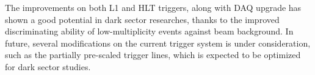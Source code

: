 The improvements on both L1 and HLT triggers, along with DAQ upgrade has shown a good potential in dark sector researches\cite{de2018first}\cite{macqueen2020dark}, thanks to the improved discriminating ability of low-multiplicity events against beam background. In future, several modifications on the current trigger system is under consideration, such as the partially pre-scaled trigger lines, which is expected to be optimized for dark sector studies\cite{b2book}. 


\begin{comment}
Based on the reasons discussed above, Belle II trigger has been designed to have 2 separated levels of triggers. Low level trigger, also called as L1 trigger, is hardware-based trigger. and high level trigger (HLT) is the software based trigger.
The L1 trigger rate can go up to 30kHz that is also the up-limit of DAQ read-in rate. The latency of L1 is control to be 5 $\mu$s, improved from Belle trigger.
And yet 30kHz is still to high for writing out the data to tape, so the HLT must be implemented to reduce the trigger rate to about 10kHz and it has to be able to select ROI on the PXD to reduce the data flux limited by bandwidth of read-out cables. To do that, HLT utilize  the full offline reconstruction algorithms to allow the access of full-granularity
event reconstruction using all detectors except for the PXD. 

\end{comment}

